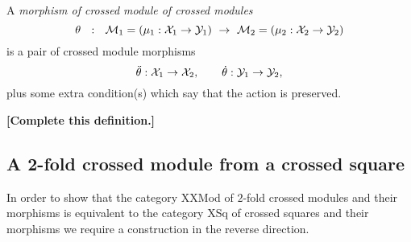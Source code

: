\medskip
\begin{defn} 
A \emph{morphism of crossed module of crossed modules}
$$
\theta ~~:~~ \mathcal{M}_1 = (\mu_1 : \mathcal{X}_1 \to \mathcal{Y}_1) 
       ~\to~ \mathcal{M}_2 = (\mu_2 : \mathcal{X}_2 \to \mathcal{Y}_2)
$$
is a pair of crossed module morphisms
$$
\ddot{\theta} : \mathcal{X}_1 \to \mathcal{X}_2, \qquad 
 \dot{\theta} : \mathcal{Y}_1 \to \mathcal{Y}_2,
$$
plus some extra condition(s) which say that the action is preserved.

\noindent
{\bf [Complete this definition.]}
\end{defn}

\bigskip
\subsection{A 2-fold crossed module from a crossed square}

In order to show that the category {\sf XXMod} of $2$-fold 
crossed modules and their morphisms is equivalent to the
category {\sf XSq} of crossed squares and their morphisms 
we require a construction in the reverse direction.

